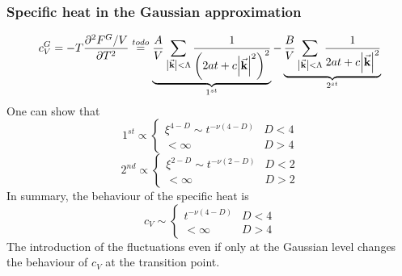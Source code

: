 \documentclass[../main/main.tex]{subfiles}
\begin{document}
\subsubsection{Specific heat in the Gaussian approximation}
\begin{equation}
  c_V^G = - T \pdv[2]{F^G/V}{T} \overset{to do}{=}   \underbrace{\frac{A}{V} \sum_{\abs{\va{k}} < \Lambda  }^{}
  \frac{1}{ \qty(2 a t + c \abs{\va{k}}^2 )^2}}_{1^{st}}
    - \underbrace{ \frac{B}{V} \sum_{\abs{\va{k}}< \Lambda  }^{} \frac{1}{2 a t + c \abs{\va{k}}^2 }}_{2^{st}}
\end{equation}
One can show that
\begin{equation}
1^{st} \propto
  \begin{cases}
   \xi ^{4-D} \sim t^{-\nu (4-D)}  & D < 4\\
  < \infty & D > 4
  \end{cases}
\end{equation}
\begin{equation}
2^{nd} \propto
  \begin{cases}
   \xi ^{2-D} \sim t^{-\nu (2-D)}  & D < 2\\
  < \infty & D > 2
  \end{cases}
\end{equation}
In summary, the behaviour of the specific heat is
\begin{equation}
  c_V \sim \begin{cases}
    t^{-\nu (4-D)} & D < 4 \\
    <\infty & D > 4
\end{cases}
\end{equation}
The introduction of the fluctuations even if only at the Gaussian level changes the behaviour of \( c_V \) at the transition point.
\end{document}
